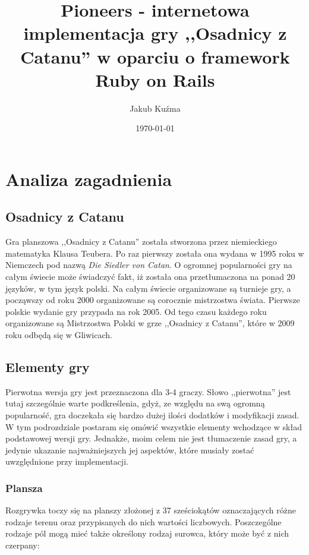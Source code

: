 \documentclass[a4paper,12pt]{article}
\begin{document}
\author{Jakub Kuźma}
\title{Pioneers - internetowa implementacja gry ,,Osadnicy z Catanu''
  w oparciu o framework Ruby on Rails}
\date{\today}

\begin{titlepage}
\maketitle
\end{titlepage}

\tableofcontents

\clearpage

\section{Analiza zagadnienia}

\subsection{Osadnicy z Catanu}
Gra planszowa ,,Osadnicy z Catanu'' została stworzona przez
niemieckiego matematyka Klausa Teubera. Po raz pierwszy została ona
wydana w 1995 roku w Niemczech pod nazwą \emph{Die Siedler von
  Catan}. O ogromnej popularności gry na całym świecie może świadczyć
fakt, iż została ona przetłumaczona na ponad 20 języków, w tym język
polski. Na całym świecie organizowane są turnieje gry, a począwszy od
roku 2000 organizowane są corocznie mistrzostwa świata. Pierwsze
polskie wydanie gry przypada na rok 2005. Od tego czasu każdego roku
organizowane są Mistrzostwa Polski w grze ,,Osadnicy z Catanu'', które
w 2009 roku odbędą się w Gliwicach.

\subsection{Elementy gry}
Pierwotna wersja gry jest przeznaczona dla 3-4 graczy. Słowo
,,pierwotna'' jest tutaj szczególnie warte podkreślenia, gdyż, ze
względu na swą ogromną popularność, gra doczekała się bardzo dużej
ilości dodatków i modyfikacji zasad. W tym podrozdziale postaram się
omówić wszystkie elementy wchodzące w skład podstawowej wersji
gry. Jednakże, moim celem nie jest tłumaczenie zasad gry, a jedynie
ukazanie najważniejszych jej aspektów, które musiały zostać
uwzględnione przy implementacji.

\subsubsection{Plansza}
Rozgrywka toczy się na planszy złożonej z 37 sześciokątów
oznaczających różne rodzaje terenu oraz przypisanych do nich wartości
liczbowych. Poszczególne rodzaje pól mogą mieć także określony rodzaj
surowca, który może być z nich czerpany:
\end{document}
